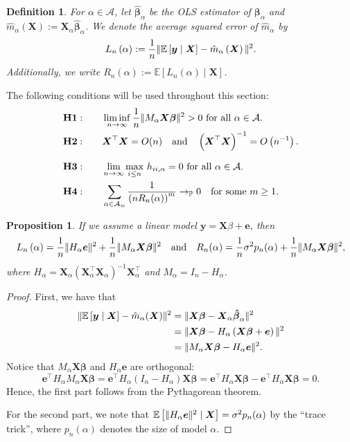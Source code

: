 \documentclass[12pt, letter paper]{article}
\newcommand{\1}{\mathmybb{1}}
\newtheorem{definition}{Definition}[section]
\newtheorem{proposition}{Proposition}[section]
\newcommand{\0}{\emptyset}
\newcommand{\prob}{\mathbb{P}}
\newcommand{\Ep}[1]{\mathbb{E}\left[ #1 \right]}
\newcommand{\paren}[1]{\left(#1 \right)}
\newcommand{\norm}[1]{|\hspace{-1pt}|#1 |\hspace{-1pt}|}
\newcommand{\normsq}[1]{\norm{#1}^{2}}
\newcommand{\Acal}{\mathcal{A}}
\newcommand{\X}{\boldsymbol{X}}
\newcommand{\y}{\boldsymbol{y}}
\newcommand{\e}{\boldsymbol{e}}
\newcommand{\bbeta}{\boldsymbol{\beta}}
\newcommand{\bbetahat}{\boldsymbol{\hat{\beta}}}
\newcommand{\Loss}[1]{L_{n}\paren{#1}}
\begin{document}
\begin{definition}
    For \(\alpha\in\Acal\), let \(\bbetahat_{\alpha}\) be the OLS estimator of \(\bbeta_{\alpha}\) and \(\hat{m}_{\alpha}(\X):=\X_{\alpha}\bbetahat_{\alpha}\). We denote the average squared error of \(\hat{m}_{\alpha}\) by
    \[\Loss{\alpha}:=\frac{1}{n}\normsq{\Ep{\y\mid\X} - \hat{m}_{\alpha}\paren{\X}}.\]
    Additionally, we write
    \(R_{n}(\alpha):= \Ep{\Loss{\alpha}\mid\X}\).
\end{definition}

    The following conditions will be used throughout this section:
    \begin{align*}
        &\mathbf{H1:}\qquad \liminf_{n\to\infty} \frac{1}{n}\normsq{M_{\alpha}\X\bbeta}>0 \text{ for all }\alpha \in\Acal.\\
        &\mathbf{H2:} \qquad \X^{\top}\X = O(n)\quad\text{and}\quad\paren{\X^{\top}\X}^{-1}= O\paren{n^{-1}}.\\[2.5mm]
        &\mathbf{H3:}\qquad \lim_{n\to\infty}\max_{i\leq n}\,h_{ii,\alpha} = 0 \text{ for all }\alpha \in\Acal.\\
        &\mathbf{H4:}\qquad \sum_{\alpha\in\Acal_{w}}\frac{1}{\paren{nR_{n}(\alpha)}^{m}}\to_{\prob}0\quad\text{for some }m\geq 1.
    \end{align*}

\begin{proposition}
    If we assume a linear model \(\y = \X\beta + \e\), then
    \[\Loss{\alpha} = \frac{1}{n}\normsq{H_{\alpha}\e} + \frac{1}{n}\normsq{M_{\alpha}\X\bbeta}\quad\text{and}\quad R_{n}(\alpha) = \frac{1}{n}\sigma^{2}p_{n}(\alpha) + \frac{1}{n}\normsq{M_{\alpha}\X\bbeta},\]
    where \(H_{\alpha} = \X_{\alpha}\paren{\X_{\alpha}^{\top}\X_{\alpha}}^{-1}\X_{\alpha}^{\top}\) and \(M_{\alpha}= I_{n} - H_{\alpha}\).
\end{proposition}

\begin{proof}
    First, we have that
    \begin{align*}
        \normsq{\Ep{\y\mid\X} - \hat{m}_{\alpha}(\X)} &= \normsq{\X\bbeta - \X_{\alpha}\bbetahat_{\alpha}}\\
        &= \normsq{\X\bbeta - H_{\alpha}\paren{\X\bbeta + \e}}\\
        &= \normsq{M_{\alpha}\X\bbeta - H_{\alpha}\e}.
    \end{align*}
    Notice that \(M_{\alpha}\X\bbeta\) and \(H_{\alpha}\e\) are orthogonal:
    \[\e^{\top}H_{\alpha}M_{\alpha}\X\bbeta  = \e^{\top}H_{\alpha}\paren{I_{n} - H_{\alpha}}\X\bbeta = \e^{\top}H_{\alpha}\X\bbeta - \e^{\top}H_{\alpha}\X\bbeta = 0.\]
    Hence, the first part follows from the Pythagorean theorem.

    For the second part, we note that \(\Ep{\normsq{H_{\alpha}\e}\mid\X} = \sigma^{2}p_{n}(\alpha)\) by the ``trace trick'', where \(p_{n}(\alpha)\) denotes the size of model \(\alpha\).
\end{proof}
\end{document}
